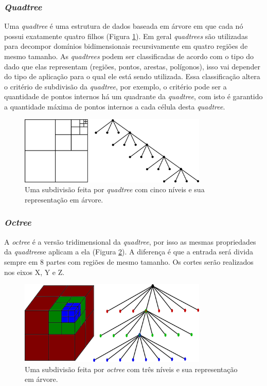 \subsubsection{\textit{Quadtree}}

Uma \textit{quadtree} é uma estrutura de dados baseada em árvore em que cada nó possui exatamente quatro filhos (Figura \ref{fig:quadtree_tree}). Em geral \textit{quadtrees} são utilizadas para decompor domínios bidimensionais recursivamente em quatro regiões de mesmo tamanho. As \textit{quadtrees} podem ser classificadas de acordo com o tipo do dado que elas representam (regiões, pontos, arestas, polígonos), isso vai depender do tipo de aplicação para o qual ele está sendo utilizada. Essa classificação altera o critério de subdivisão da \textit{quadtree}, por exemplo, o critério pode ser a quantidade de pontos internos há um quadrante da \textit{quadtree}, com isto é garantido a quantidade máxima de pontos internos a cada célula desta \textit{quadtree}.

 \begin{figure}[htbp]
     \centering
     \includegraphics[width=0.8\textwidth]{fig/quadtree_tree.png}
     \caption{Uma subdivisão feita por \textit{quadtree} com cinco níveis e sua representação em árvore.} 
     \label{fig:quadtree_tree}
 \end{figure}

\subsubsection{\textit{Octree}} 

A \textit{octree} é a versão tridimensional da \textit{quadtree}, por isso as mesmas propriedades da \textit{quadtree}se aplicam a ela (Figura \ref{fig:octree_tree}). A diferença é que a entrada será divida sempre em 8 partes com regiões de mesmo tamanho. Os cortes serão realizados nos eixos X, Y e Z.	


 \begin{figure}[htbp]
     \centering
     \includegraphics[width=0.8\textwidth]{fig/octree_tree.png}
     \caption{Uma subdivisão feita por \textit{octree} com três níveis e sua representação em árvore.} 
     \label{fig:octree_tree}
 \end{figure}


